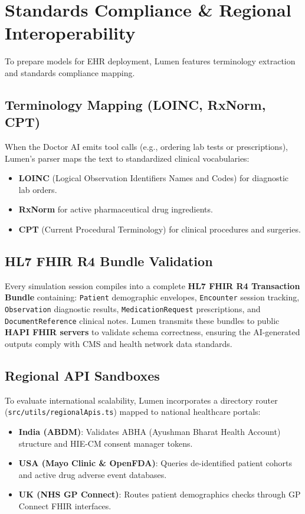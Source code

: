 \documentclass[10pt,journal,compsoc]{IEEEtran}
\begin{document}
\section{Standards Compliance \& Regional Interoperability}
To prepare models for EHR deployment, Lumen features terminology extraction and standards compliance mapping.

\subsection{Terminology Mapping (LOINC, RxNorm, CPT)}
When the Doctor AI emits tool calls (e.g., ordering lab tests or prescriptions), Lumen's parser maps the text to standardized clinical vocabularies:
\begin{itemize}
    \item \textbf{LOINC} (Logical Observation Identifiers Names and Codes) for diagnostic lab orders.
    \item \textbf{RxNorm} for active pharmaceutical drug ingredients.
    \item \textbf{CPT} (Current Procedural Terminology) for clinical procedures and surgeries.
\end{itemize}

\subsection{HL7 FHIR R4 Bundle Validation}
Every simulation session compiles into a complete \textbf{HL7 FHIR R4 Transaction Bundle} containing: \texttt{Patient} demographic envelopes, \texttt{Encounter} session tracking, \texttt{Observation} diagnostic results, \texttt{MedicationRequest} prescriptions, and \texttt{DocumentReference} clinical notes.
Lumen transmits these bundles to public \textbf{HAPI FHIR servers} to validate schema correctness, ensuring the AI-generated outputs comply with CMS and health network data standards.

\subsection{Regional API Sandboxes}
To evaluate international scalability, Lumen incorporates a directory router (\texttt{src/utils/regionalApis.ts}) mapped to national healthcare portals:
\begin{itemize}
    \item \textbf{India (ABDM)}: Validates ABHA (Ayushman Bharat Health Account) structure and HIE-CM consent manager tokens.
    \item \textbf{USA (Mayo Clinic \& OpenFDA)}: Queries de-identified patient cohorts and active drug adverse event databases.
    \item \textbf{UK (NHS GP Connect)}: Routes patient demographics checks through GP Connect FHIR interfaces.
\end{itemize}
\end{document}
